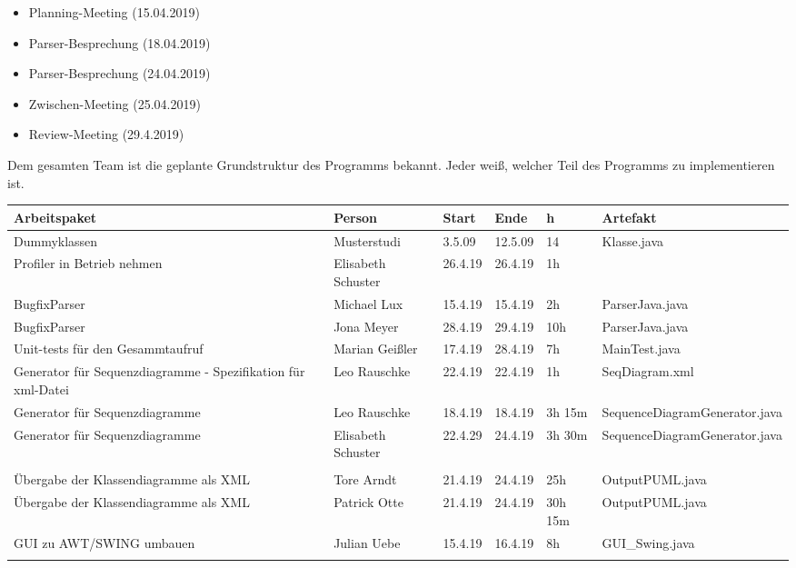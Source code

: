 \begin{itemize}
\item Planning-Meeting (15.04.2019)
\item Parser-Besprechung (18.04.2019)
\item Parser-Besprechung (24.04.2019)
\item Zwischen-Meeting (25.04.2019)
\item Review-Meeting (29.4.2019)
\end{itemize}
\nsecend%

Dem gesamten Team ist die geplante Grundstruktur des Programms bekannt. Jeder weiß, welcher Teil des Programms zu implementieren ist.
\nsecend
{}
\begin{longtable}{|p{4cm}|l|l|l|l|l|}
        \hline
        Arbeitspaket & Person & Start & Ende & h & Artefakt\\
        \hline
        Dummyklassen & Musterstudi & 3.5.09 & 12.5.09 & 14 & Klasse.java\\ \hline
     
     
        Profiler in Betrieb nehmen & Elisabeth Schuster & 26.4.19 & 26.4.19 & 1h &  \\ \hline
        
        
        BugfixParser & Michael Lux & 15.4.19 & 15.4.19 & 2h & ParserJava.java\\ \hline
        
        BugfixParser & Jona Meyer & 28.4.19 & 29.4.19 & 10h & ParserJava.java\\ \hline
       
      

        Unit-tests für den Gesammtaufruf & Marian Geißler & 17.4.19 & 28.4.19 & 7h & MainTest.java\\ \hline


        Generator für Sequenzdiagramme - Spezifikation für xml-Datei & Leo Rauschke & 22.4.19 & 22.4.19 & 1h & SeqDiagram.xml\\ \hline
        
        Generator für Sequenzdiagramme & Leo Rauschke & 18.4.19 & 18.4.19 & 3h 15m & SequenceDiagramGenerator.java \\ \hline      
       Generator für Sequenzdiagramme & Elisabeth Schuster & 22.4.29 &  24.4.19 & 3h 30m & SequenceDiagramGenerator.java\\ \hline\\       
       Übergabe der Klassendiagramme als XML & Tore Arndt & 21.4.19  & 24.4.19 & 25h & OutputPUML.java\\ \hline
        Übergabe der Klassendiagramme als XML & Patrick Otte & 21.4.19  & 24.4.19 & 30h 15m & OutputPUML.java\\ \hline   
       GUI zu AWT/SWING umbauen & Julian Uebe & 15.4.19 & 16.4.19 & 8h & GUI_Swing.java \\ \hline\\
       
        
       
\end{longtable}     
\nsecend

